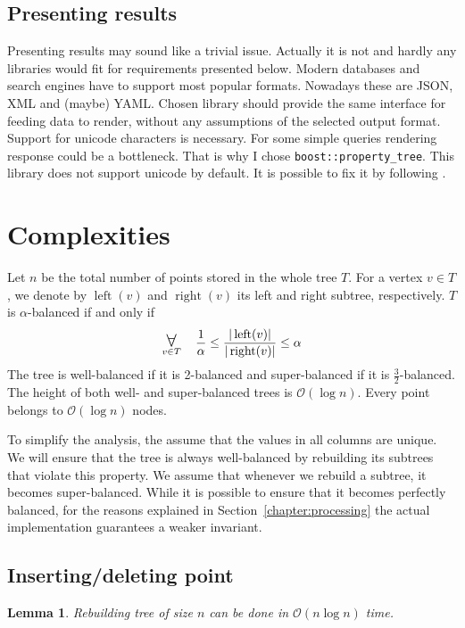 \documentclass[10pt,a4paper]{article}
\newtheorem{lemma}{Lemma}
\DeclareMathOperator{\rightSon}{right}
\DeclareMathOperator{\leftSon}{left}
\newcommand{\Oh}{\mathcal{O}}
\newcommand\bigforall{\mbox{\Large $\mathsurround0pt\forall$}}
\begin{document}
\subsection{Presenting results}

Presenting results may sound like a trivial issue. Actually it is not and hardly any libraries would fit for requirements presented below. Modern databases and search engines have to support most popular formats. Nowadays these are JSON, XML and (maybe) YAML. Chosen library should provide the same interface for feeding data to render, without any assumptions of the selected output format. Support for unicode characters is necessary. For some simple queries rendering response could be a bottleneck. That is why I chose \verb|boost::property_tree|. This library does not support unicode by default. It is possible to fix it by following \cite{SOANS} .

\section{Complexities}
\label{chapter:complexity}

Let $n$ be the total number of points stored in the whole tree $T$. For a vertex $v\in T$, we denote by $\leftSon(v)$ and $\rightSon(v)$ its left and right subtree, respectively. $T$ is $\alpha$-balanced if and only if 
$$\displaystyle\mathop{\bigforall}_{v\in T} \quad \frac{1}{\alpha} \leq \frac{|\leftSon(v)|}{|\rightSon(v)|} \leq \alpha$$
The tree is well-balanced if it is 2-balanced and super-balanced if it is  $\frac{3}{2}$-balanced. The height of both well- and super-balanced trees is $\Oh(\log n)$. Every point belongs to $\Oh(\log n)$ nodes. 

To simplify the analysis, the assume that the values in all columns are unique. We will ensure that the tree is always well-balanced by rebuilding its subtrees that violate this property. We assume that whenever we rebuild a subtree, it becomes super-balanced. While it is possible to ensure that it becomes perfectly balanced, for the reasons explained in Section~\ref{chapter:processing} the actual implementation guarantees a weaker invariant.

\subsection{Inserting/deleting point}

\begin{lemma}\label{lem:1}
Rebuilding tree of size $n$ can be done in $\Oh(n \log n)$ time.
\end{lemma}
\end{document}
